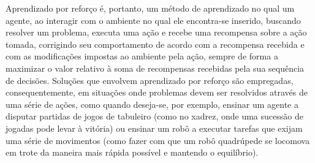 \documentclass[cic,tc]{iiufrgs}
\begin{document}
%

Aprendizado por reforço é, portanto, um método de aprendizado no qual um agente,
ao interagir com o ambiente no qual ele encontra-se inserido,
buscando resolver um problema, executa uma ação e
recebe uma recompensa sobre a ação tomada, corrigindo seu comportamento de
acordo com a recompensa recebida e com as modificações impostas ao ambiente pela
ação, sempre de forma a maximizar o valor relativo à soma de recompensas recebidas pela
sua sequência de decisões. Soluções que envolvem aprendizado por reforço são
empregadas, consequentemente, em situações onde problemas devem ser resolvidos
através de uma série de ações, como quando deseja-se, por exemplo, ensinar
um agente a disputar partidas de jogos de tabuleiro (como no xadrez, onde
uma sucessão de jogadas pode levar à vitória) ou ensinar um robô a executar tarefas que
exijam uma série de movimentos (como fazer com que um robô quadrúpede se
locomova em trote da maneira mais rápida possível e mantendo o equilíbrio).
\end{document}
